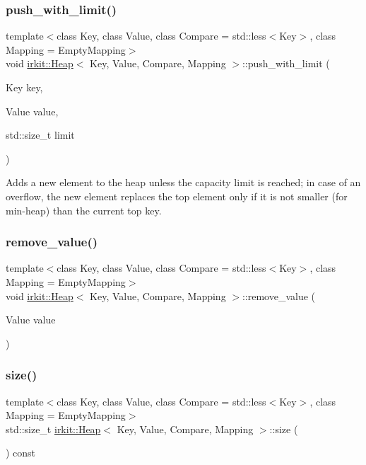 \subsubsection{\texorpdfstring{push\+\_\+with\+\_\+limit()}{push\_with\_limit()}}
{\footnotesize\ttfamily template$<$class Key, class Value, class Compare = std\+::less$<$\+Key$>$, class Mapping = Empty\+Mapping$>$ \\
void \mbox{\hyperlink{classirkit_1_1Heap}{irkit\+::\+Heap}}$<$ Key, Value, Compare, Mapping $>$\+::push\+\_\+with\+\_\+limit (\begin{DoxyParamCaption}\item[{Key}]{key,  }\item[{Value}]{value,  }\item[{std\+::size\+\_\+t}]{limit }\end{DoxyParamCaption})\hspace{0.3cm}{\ttfamily [inline]}}

Adds a new element to the heap unless the capacity limit is reached; in case of an overflow, the new element replaces the top element only if it is not smaller (for min-\/heap) than the current top key. \mbox{\label{classirkit_1_1Heap_a0da9e0bc583dadad14b10d285e7a8925}} 
\subsubsection{\texorpdfstring{remove\+\_\+value()}{remove\_value()}}
{\footnotesize\ttfamily template$<$class Key, class Value, class Compare = std\+::less$<$\+Key$>$, class Mapping = Empty\+Mapping$>$ \\
void \mbox{\hyperlink{classirkit_1_1Heap}{irkit\+::\+Heap}}$<$ Key, Value, Compare, Mapping $>$\+::remove\+\_\+value (\begin{DoxyParamCaption}\item[{Value}]{value }\end{DoxyParamCaption})\hspace{0.3cm}{\ttfamily [inline]}}

\mbox{\label{classirkit_1_1Heap_acc53589d12325834624aa08573139227}} 
\subsubsection{\texorpdfstring{size()}{size()}}
{\footnotesize\ttfamily template$<$class Key, class Value, class Compare = std\+::less$<$\+Key$>$, class Mapping = Empty\+Mapping$>$ \\
std\+::size\+\_\+t \mbox{\hyperlink{classirkit_1_1Heap}{irkit\+::\+Heap}}$<$ Key, Value, Compare, Mapping $>$\+::size (\begin{DoxyParamCaption}{ }\end{DoxyParamCaption}) const\hspace{0.3cm}{\ttfamily [inline]}}

